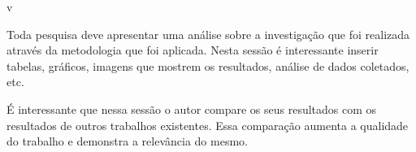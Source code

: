 v

Toda pesquisa deve apresentar uma análise sobre a investigação que foi
realizada através da metodologia que foi aplicada. Nesta sessão é interessante
inserir tabelas, gráficos, imagens que mostrem os resultados, análise de dados
coletados, etc.

É interessante que nessa sessão o autor compare os seus resultados com os
resultados de outros trabalhos existentes. Essa comparação aumenta a qualidade
do trabalho e demonstra a relevância do mesmo. 

